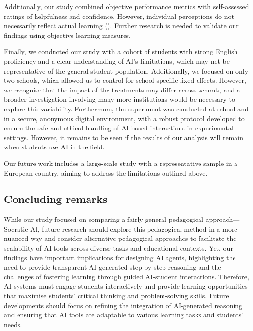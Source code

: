 \documentclass[
  12pt,
]{article}
\begin{document}
Additionally, our study combined objective performance metrics with self-assessed ratings of helpfulness and confidence. However, individual perceptions do not necessarily reflect actual learning (). Further research is needed to validate our findings using objective learning measures.

Finally, we conducted our study with a cohort of students with strong English proficiency and a clear understanding of AI's limitations, which may not be representative of the general student population. Additionally, we focused on only two schools, which allowed us to control for school-specific fixed effects. However, we recognise that the impact of the treatments may differ across schools, and a broader investigation involving many more institutions would be necessary to explore this variability. Furthermore, the experiment was conducted at school and in a secure, anonymous digital environment, with a robust protocol developed to ensure the safe and ethical handling of AI-based interactions in experimental settings. However, it remains to be seen if the results of our analysis will remain when students use AI in the field.

Our future work includes a large-scale study with a representative sample in a European country, aiming to address the limitations outlined above.

\subsection{Concluding remarks}\label{concluding-remarks}

While our study focused on comparing a fairly general pedagogical approach---Socratic AI, future research should explore this pedagogical method in a more nuanced way and consider alternative pedagogical approaches to facilitate the scalability of AI tools across diverse tasks and educational contexts. Yet, our findings have important implications for designing AI agents, highlighting the need to provide transparent AI-generated step-by-step reasoning and the challenges of fostering learning through guided AI-student interactions. Therefore, AI systems must engage students interactively and provide learning opportunities that maximise students' critical thinking and problem-solving skills. Future developments should focus on refining the integration of AI-generated reasoning and ensuring that AI tools are adaptable to various learning tasks and students' needs.
\end{document}
